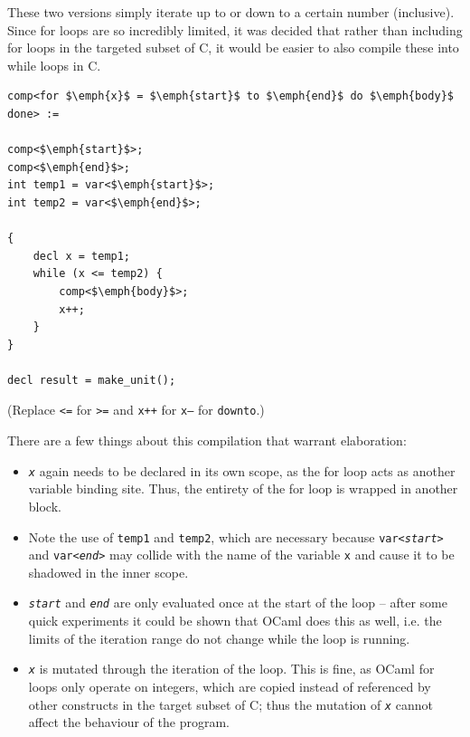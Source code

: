 \documentclass[12pt,a4paper,twoside,openright]{report}
\begin{document}
These two versions simply iterate up to or down to a certain number 
(inclusive). Since for loops are so incredibly limited, it was decided 
that rather than including for loops in the targeted subset of C, it would be 
easier to also compile these into while loops in C.

\begin{lstlisting}
comp<for $\emph{x}$ = $\emph{start}$ to $\emph{end}$ do $\emph{body}$ done> :=

comp<$\emph{start}$>;
comp<$\emph{end}$>;
int temp1 = var<$\emph{start}$>;
int temp2 = var<$\emph{end}$>;

{
    decl x = temp1;
    while (x <= temp2) {
        comp<$\emph{body}$>;
        x++;
    }
}

decl result = make_unit();
\end{lstlisting}

(Replace \texttt{<=} for \texttt{>=} and \texttt{x++} for \texttt{x--} for 
\texttt{downto}.)

There are a few things about this compilation that warrant elaboration:
\begin{itemize}

\item \texttt{\emph{x}} again needs to be declared in its own scope, as the for
    loop acts as another variable binding site. Thus, the entirety of the for
    loop is wrapped in another block.

\item Note the use of \texttt{temp1} and \texttt{temp2}, which are necessary
    because \texttt{var<\emph{start}>} and \texttt{var<\emph{end}>} may collide
    with the name of the variable \texttt{x} and cause it to be shadowed in the
    inner scope.

\item \texttt{\emph{start}} and \texttt{\emph{end}} are only evaluated once at
    the start of the loop -- after some quick experiments it could be shown that
    OCaml does this as well, i.e. the limits of the iteration range do not
    change while the loop is running.

\item \texttt{\emph{x}} is mutated through the iteration of the loop. This is
    fine, as OCaml for loops only operate on integers, which are copied instead
    of referenced by other constructs in the target subset of C; thus the
    mutation of \texttt{\emph{x}} cannot affect the behaviour of the program.

\end{itemize}
\end{document}

